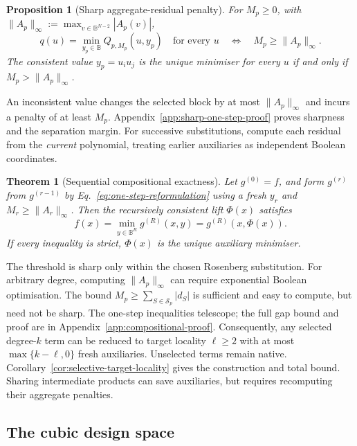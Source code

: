 \documentclass[a4paper,onecolumn,11pt,unpublished]{quantumarticle}
\newtheorem{theorem}[theorem]{Theorem}
\newtheorem{proposition}[proposition]{Proposition}
\theoremstyle{remark}
\begin{document}
\begin{proposition}[Sharp aggregate-residual penalty]
\label{prop:sharp-aggregate-residual}
For $M_p\geq0$, with $\|A_p\|_\infty:=\max_{v\in\mathbb B^{N-2}}|A_p(v)|$,
\begin{equation}
q(u)=\min_{y_p\in\mathbb B}Q_{p,M_p}(u,y_p)\quad\text{for every }u
\quad\Longleftrightarrow\quad M_p\geq\|A_p\|_\infty.
\label{eq:sharp-one-step-threshold}
\end{equation}
The consistent value $y_p=u_i u_j$ is the unique minimiser for every $u$
if and only if $M_p>\|A_p\|_\infty$.
\end{proposition}

An inconsistent value changes the selected block by at most
$\|A_p\|_\infty$ and incurs a penalty of at least $M_p$.
Appendix~\ref{app:sharp-one-step-proof} proves sharpness and the separation
margin. For successive substitutions, compute each residual from the
\emph{current} polynomial, treating earlier auxiliaries as independent
Boolean coordinates.

\begin{theorem}[Sequential compositional exactness]
\label{thm:sequential-compositional-exactness}
Let $g^{(0)}=f$, and form $g^{(r)}$ from $g^{(r-1)}$ by
Eq.~\eqref{eq:one-step-reformulation} using a fresh $y_r$ and
$M_r\geq\|A_r\|_\infty$. Then the recursively consistent lift $\Phi(x)$ satisfies
\begin{equation}
f(x)=\min_{y\in\mathbb B^R}g^{(R)}(x,y)=g^{(R)}(x,\Phi(x)).
\label{eq:compositional-exactness}
\end{equation}
If every inequality is strict, $\Phi(x)$ is the unique auxiliary minimiser.
\end{theorem}

The threshold is sharp only within the chosen Rosenberg substitution.
For arbitrary degree, computing $\|A_p\|_\infty$ can require exponential
Boolean optimisation. The bound $M_p\geq\sum_{S\in\mathcal S_p}|d_S|$
is sufficient and easy to compute, but need not be sharp.
The one-step inequalities telescope; the full gap bound and proof are in
Appendix~\ref{app:compositional-proof}. Consequently, any selected degree-$k$
term can be reduced to target locality $\ell\geq2$ with at most
$\max\{k-\ell,0\}$ fresh auxiliaries. Unselected terms remain native.
Corollary~\ref{cor:selective-target-locality} gives the construction and total
bound. Sharing intermediate products can save auxiliaries, but requires
recomputing their aggregate penalties.

\subsection{The cubic design space}
\label{sec:cubic-specialisation}
\end{document}
